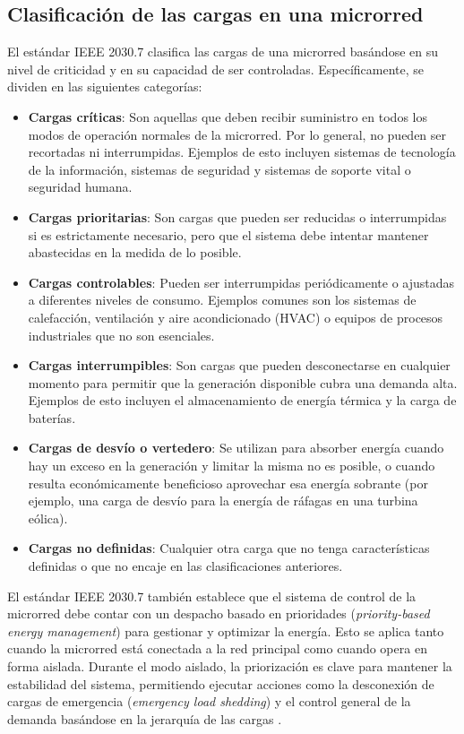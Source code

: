 \subsection{Clasificación de las cargas en una microrred}
El estándar IEEE 2030.7 clasifica las cargas de una microrred basándose en su nivel de criticidad y en su capacidad de ser controladas. Específicamente, se dividen en las siguientes categorías:
\begin{itemize}
    \item \textbf{Cargas críticas}: Son aquellas que deben recibir suministro en todos los modos de operación normales de la microrred. Por lo general, no pueden ser recortadas ni interrumpidas. Ejemplos de esto incluyen sistemas de tecnología de la información, sistemas de seguridad y sistemas de soporte vital o seguridad humana.
    \item \textbf{Cargas prioritarias}: Son cargas que pueden ser reducidas o interrumpidas si es estrictamente necesario, pero que el sistema debe intentar mantener abastecidas en la medida de lo posible.
    \item \textbf{Cargas controlables}: Pueden ser interrumpidas periódicamente o ajustadas a diferentes niveles de consumo. Ejemplos comunes son los sistemas de calefacción, ventilación y aire acondicionado (HVAC) o equipos de procesos industriales que no son esenciales.
    \item \textbf{Cargas interrumpibles}: Son cargas que pueden desconectarse en cualquier momento para permitir que la generación disponible cubra una demanda alta. Ejemplos de esto incluyen el almacenamiento de energía térmica y la carga de baterías.
    \item \textbf{Cargas de desvío o vertedero}: Se utilizan para absorber energía cuando hay un exceso en la generación y limitar la misma no es posible, o cuando resulta económicamente beneficioso aprovechar esa energía sobrante (por ejemplo, una carga de desvío para la energía de ráfagas en una turbina eólica).
    \item \textbf{Cargas no definidas}: Cualquier otra carga que no tenga características definidas o que no encaje en las clasificaciones anteriores.
\end{itemize}

El estándar IEEE 2030.7 también establece que el sistema de control de la microrred debe contar con un despacho basado en prioridades (\textit{priority-based energy management}) para gestionar y optimizar la energía. Esto se aplica tanto cuando la microrred está conectada a la red principal como cuando opera en forma aislada. Durante el modo aislado, la priorización es clave para mantener la estabilidad del sistema, permitiendo ejecutar acciones como la desconexión de cargas de emergencia (\textit{emergency load shedding}) y el control general de la demanda basándose en la jerarquía de las cargas \cite{IEEE2030-7-2017}.

